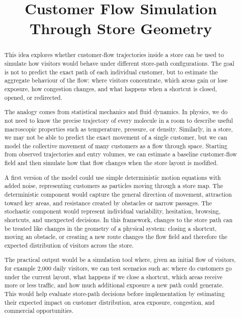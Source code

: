 \documentclass[11pt,a4paper]{article}
\title{Customer Flow Simulation Through Store Geometry}
\author{}
\date{}
\begin{document}
\maketitle

\begin{abstract}
This idea explores whether customer-flow trajectories inside a store can be used to simulate how visitors would behave under different store-path configurations. The goal is not to predict the exact path of each individual customer, but to estimate the aggregate behaviour of the flow: where visitors concentrate, which areas gain or lose exposure, how congestion changes, and what happens when a shortcut is closed, opened, or redirected.

The analogy comes from statistical mechanics and fluid dynamics. In physics, we do not need to know the precise trajectory of every molecule in a room to describe useful macroscopic properties such as temperature, pressure, or density. Similarly, in a store, we may not be able to predict the exact movement of a single customer, but we can model the collective movement of many customers as a flow through space. Starting from observed trajectories and entry volumes, we can estimate a baseline customer-flow field and then simulate how that flow changes when the store layout is modified.

A first version of the model could use simple deterministic motion equations with added noise, representing customers as particles moving through a store map. The deterministic component would capture the general direction of movement, attraction toward key areas, and resistance created by obstacles or narrow passages. The stochastic component would represent individual variability, hesitation, browsing, shortcuts, and unexpected decisions. In this framework, changes to the store path can be treated like changes in the geometry of a physical system: closing a shortcut, moving an obstacle, or creating a new route changes the flow field and therefore the expected distribution of visitors across the store.

The practical output would be a simulation tool where, given an initial flow of visitors, for example 2,000 daily visitors, we can test scenarios such as: where do customers go under the current layout, what happens if we close a shortcut, which areas receive more or less traffic, and how much additional exposure a new path could generate. This would help evaluate store-path decisions before implementation by estimating their expected impact on customer distribution, area exposure, congestion, and commercial opportunities.
\end{abstract}
\end{document}
